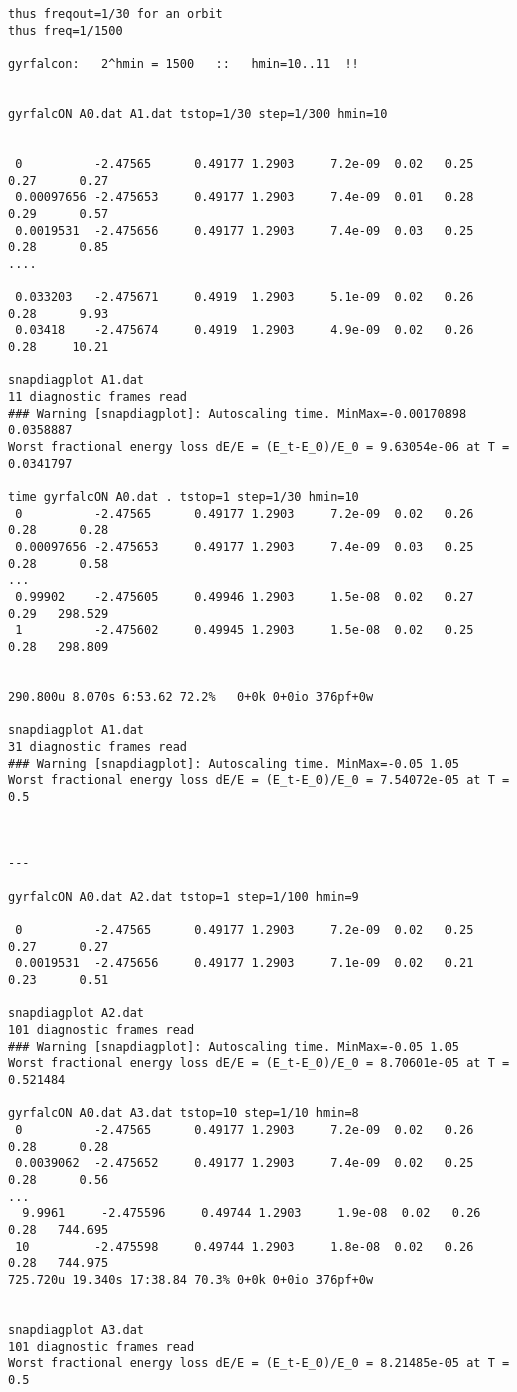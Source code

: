 \begin{verbatim}
thus freqout=1/30 for an orbit
thus freq=1/1500 

gyrfalcon:   2^hmin = 1500   ::   hmin=10..11  !!


gyrfalcON A0.dat A1.dat tstop=1/30 step=1/300 hmin=10


 0          -2.47565      0.49177 1.2903     7.2e-09  0.02   0.25       0.27      0.27
 0.00097656 -2.475653     0.49177 1.2903     7.4e-09  0.01   0.28       0.29      0.57
 0.0019531  -2.475656     0.49177 1.2903     7.4e-09  0.03   0.25       0.28      0.85
....

 0.033203   -2.475671     0.4919  1.2903     5.1e-09  0.02   0.26       0.28      9.93
 0.03418    -2.475674     0.4919  1.2903     4.9e-09  0.02   0.26       0.28     10.21

snapdiagplot A1.dat
11 diagnostic frames read
### Warning [snapdiagplot]: Autoscaling time. MinMax=-0.00170898 0.0358887
Worst fractional energy loss dE/E = (E_t-E_0)/E_0 = 9.63054e-06 at T = 0.0341797

time gyrfalcON A0.dat . tstop=1 step=1/30 hmin=10
 0          -2.47565      0.49177 1.2903     7.2e-09  0.02   0.26       0.28      0.28
 0.00097656 -2.475653     0.49177 1.2903     7.4e-09  0.03   0.25       0.28      0.58
...
 0.99902    -2.475605     0.49946 1.2903     1.5e-08  0.02   0.27       0.29   298.529
 1          -2.475602     0.49945 1.2903     1.5e-08  0.02   0.25       0.28   298.809


290.800u 8.070s 6:53.62 72.2%   0+0k 0+0io 376pf+0w

snapdiagplot A1.dat
31 diagnostic frames read
### Warning [snapdiagplot]: Autoscaling time. MinMax=-0.05 1.05
Worst fractional energy loss dE/E = (E_t-E_0)/E_0 = 7.54072e-05 at T = 0.5



---

gyrfalcON A0.dat A2.dat tstop=1 step=1/100 hmin=9

 0          -2.47565      0.49177 1.2903     7.2e-09  0.02   0.25       0.27      0.27
 0.0019531  -2.475656     0.49177 1.2903     7.1e-09  0.02   0.21       0.23      0.51

snapdiagplot A2.dat
101 diagnostic frames read
### Warning [snapdiagplot]: Autoscaling time. MinMax=-0.05 1.05
Worst fractional energy loss dE/E = (E_t-E_0)/E_0 = 8.70601e-05 at T = 0.521484

gyrfalcON A0.dat A3.dat tstop=10 step=1/10 hmin=8
 0          -2.47565      0.49177 1.2903     7.2e-09  0.02   0.26       0.28      0.28
 0.0039062  -2.475652     0.49177 1.2903     7.4e-09  0.02   0.25       0.28      0.56
...
  9.9961     -2.475596     0.49744 1.2903     1.9e-08  0.02   0.26       0.28   744.695
 10         -2.475598     0.49744 1.2903     1.8e-08  0.02   0.26       0.28   744.975
725.720u 19.340s 17:38.84 70.3% 0+0k 0+0io 376pf+0w


snapdiagplot A3.dat
101 diagnostic frames read
Worst fractional energy loss dE/E = (E_t-E_0)/E_0 = 8.21485e-05 at T = 0.5



\end{verbatim}\normalsize

